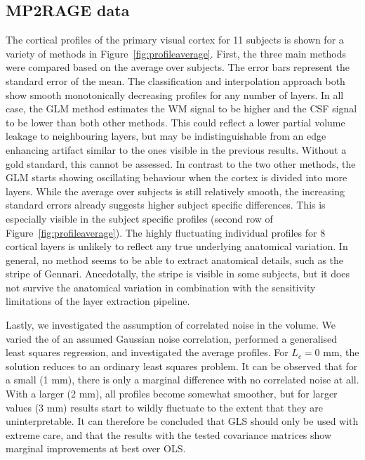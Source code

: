 \subsection{MP2RAGE data}
The cortical profiles of the primary visual cortex for 11 subjects is shown for a variety of methods in Figure~\ref{fig:profileaverage}. First, the three main methods were compared based on the average over subjects. The error bars represent the standard error of the mean. The classification and interpolation approach both show smooth monotonically decreasing profiles for any number of layers. In all case, the GLM method estimates the WM signal to be higher and the CSF signal to be lower than both other methods. This could reflect a lower partial volume leakage to neighbouring layers, but may be indistinguishable from an edge enhancing artifact similar to the ones visible in the previous results. Without a gold standard, this cannot be assessed. In contrast to the two other methods, the GLM starts showing oscillating behaviour when the cortex is divided into more layers.  While the average over subjects is still relatively smooth, the increasing standard errors already suggests higher subject specific differences. This is especially visible in the subject specific profiles (second row of Figure~\ref{fig:profileaverage}). The highly fluctuating individual profiles for 8 cortical layers is unlikely to reflect any true underlying anatomical variation. In general, no method seems to be able to extract anatomical details, such as the stripe of Gennari. Anecdotally, the stripe is visible in some subjects, but it does not survive the anatomical variation in combination with the sensitivity limitations of the layer extraction pipeline.

Lastly, we investigated the assumption of correlated noise in the volume. We varied the  of an assumed Gaussian noise correlation, performed a generalised least squares regression, and investigated the average profiles. For $L_c= 0$ mm, the solution reduces to an ordinary least squares problem. It can be observed that for a small  (1 mm), there is only a marginal difference with no correlated noise at all. With a larger  (2 mm), all profiles become somewhat smoother, but for larger values (3 mm) results start to wildly fluctuate to the extent that they are uninterpretable. It can therefore be concluded that GLS should only be used with extreme care, and that the results with the tested covariance matrices show marginal improvements at best over OLS.

